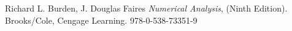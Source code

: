 \documentclass[a4paper]{article}
\begin{document}
\begin{thebibliography}{99}


 Richard L. Burden, J. Douglas Faires \textit{Numerical Analysis}, (Ninth Edition). Brooks/Cole, Cengage Learning. 978-0-538-73351-9






\end{thebibliography}
\end{document}
